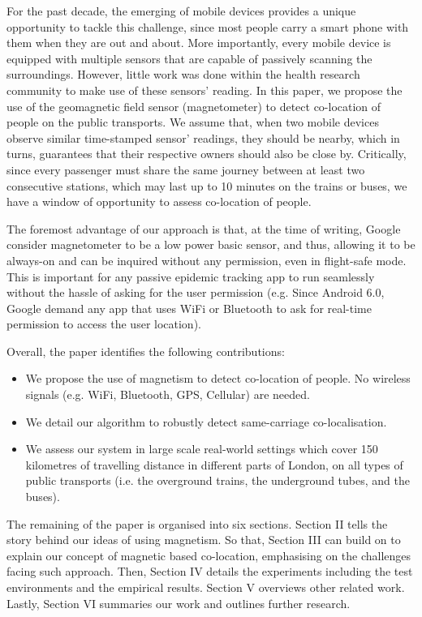 \documentclass[conference]{IEEEtran}
\begin{document}
For the past decade, the emerging of mobile devices provides a unique opportunity to tackle this challenge, since most people carry a smart phone with them when they are out and about. More importantly, every mobile device is equipped with multiple sensors that are capable of passively scanning the surroundings. However, little work was done within the health research community to make use of these sensors' reading. In this paper, we propose the use of the geomagnetic field sensor (magnetometer) to detect co-location of people on the public transports. We assume that, when two mobile devices observe similar time-stamped sensor' readings, they should be nearby, which in turns, guarantees that their respective owners should also be close by. Critically, since every passenger must share the same journey between at least two consecutive stations, which may last up to 10 minutes on the trains or buses, we have a window of opportunity to assess co-location of people.

The foremost advantage of our approach is that, at the time of writing, Google consider magnetometer to be a low power basic sensor, and thus, allowing it to be always-on and can be inquired without any permission, even in flight-safe mode. This is important for any passive epidemic tracking app to run seamlessly without the hassle of asking for the user permission (e.g. Since Android 6.0, Google demand any app that uses WiFi or Bluetooth to ask for real-time permission to access the user location).

Overall, the paper identifies the following contributions:
\begin{itemize}
	\item We propose the use of magnetism to detect co-location of people. No wireless signals (e.g. WiFi, Bluetooth, GPS, Cellular) are needed.
	\item We detail our algorithm to robustly detect same-carriage co-localisation.
	\item We assess our system in large scale real-world settings which cover 150 kilometres of travelling distance in different parts of London, on all types of public transports (i.e. the overground trains, the underground tubes, and the buses).
\end{itemize}

The remaining of the paper is organised into six sections. Section II tells the story behind our ideas of using magnetism. So that, Section III can build on to explain our concept of magnetic based co-location, emphasising on the challenges facing such approach. Then, Section IV details the experiments including the test environments and the empirical results. Section V overviews other related work. Lastly, Section VI summaries our work and outlines further research.
\end{document}
